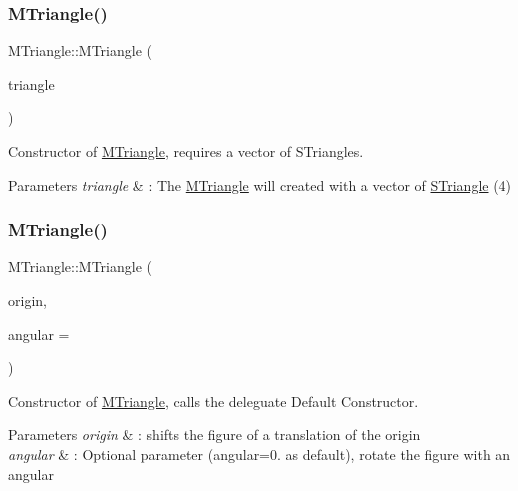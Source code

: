 \subsubsection{\texorpdfstring{M\+Triangle()}{MTriangle()}\hspace{0.1cm}{\footnotesize\ttfamily [1/2]}}
{\footnotesize\ttfamily M\+Triangle\+::\+M\+Triangle (\begin{DoxyParamCaption}\item[{const std\+::vector$<$ \hyperlink{classSTriangle}{S\+Triangle} $>$ \&}]{triangle }\end{DoxyParamCaption})\hspace{0.3cm}{\ttfamily [explicit]}}



Constructor of \hyperlink{classMTriangle}{M\+Triangle}, requires a vector of S\+Triangles. 


\begin{DoxyParams}{Parameters}
{\em triangle} & \+: The \hyperlink{classMTriangle}{M\+Triangle} will created with a vector of \hyperlink{classSTriangle}{S\+Triangle} (4) \\
\hline
\end{DoxyParams}
\mbox{\label{classMTriangle_aaf64b05da66c9196dcddbd0e4791096f}} 
\subsubsection{\texorpdfstring{M\+Triangle()}{MTriangle()}\hspace{0.1cm}{\footnotesize\ttfamily [2/2]}}
{\footnotesize\ttfamily M\+Triangle\+::\+M\+Triangle (\begin{DoxyParamCaption}\item[{\hyperlink{classPoint}{Point}$<$ double $>$}]{origin,  }\item[{double}]{angular = {} }\end{DoxyParamCaption})\hspace{0.3cm}{\ttfamily [explicit]}}



Constructor of \hyperlink{classMTriangle}{M\+Triangle}, calls the deleguate Default Constructor. 


\begin{DoxyParams}{Parameters}
{\em origin} & \+: shifts the figure of a translation of the origin \\
\hline
{\em angular} & \+: Optional parameter (angular=0. as default), rotate the figure with an angular \\
\hline
\end{DoxyParams}


